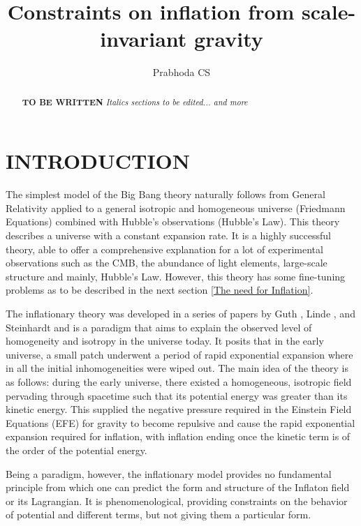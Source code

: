 \documentclass[aps,prd,reprint,preprintnumbers,showpacs,floatfix,nofootinbib,superscript address]{revtex4-2}
\begin{document}
\title{Constraints on inflation from scale-invariant gravity}

\author{Prabhoda CS}

\begin{abstract}

\textbf{TO BE WRITTEN}
\textit{Italics sections to be edited... and more}
\end{abstract}

\maketitle
\section{INTRODUCTION}

\indent The simplest model of the Big Bang theory naturally follows from General Relativity applied to a general isotropic and homogeneous universe (Friedmann Equations) combined with Hubble's observations (Hubble's Law). This theory describes a universe with a constant expansion rate. It is a highly successful theory, able to offer a comprehensive explanation for a lot of experimental observations such as the CMB, the abundance of light elements, large-scale structure and mainly, Hubble's Law. However, this theory has some fine-tuning problems as to be described in the next section \ref{The need for Inflation}. 

The inflationary theory was developed in a series of papers by Guth \cite{GuthOriginalPaper}, Linde \cite{LINDE1982389}, and Steinhardt \cite{PhysRevLett.48.1220} and is a paradigm that aims to explain the observed level of homogeneity and isotropy in the universe today. It posits that in the early universe, a small patch underwent a period of rapid exponential expansion where in all the initial inhomogeneities were wiped out. The main idea of the theory is as follows: during the early universe, there existed a homogeneous, isotropic field pervading through spacetime such that its potential energy was greater than its kinetic energy. This supplied the negative pressure required in the Einstein Field Equations (EFE) for gravity to become repulsive and cause the rapid exponential expansion required for inflation, with inflation ending once the kinetic term is of the order of the potential energy.

Being a paradigm, however, the inflationary model provides no fundamental principle from which one can predict the form and structure of the Inflaton field or its Lagrangian. It is phenomenological, providing constraints on the behavior of potential and different terms, but not giving them a particular form.
\end{document}
